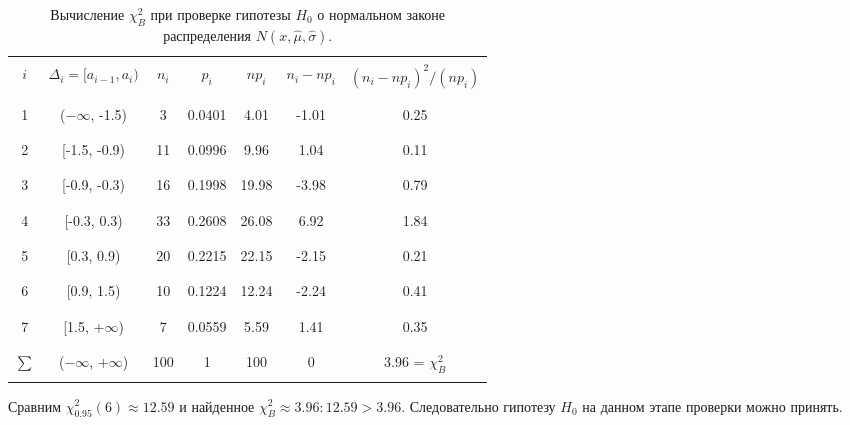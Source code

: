 \documentclass[../body.tex]{subfiles}
\begin{document}
	\begin{table}[H]
		\centering
		\begin{tabular}{| c | c | c | c | c | c | c |}
			\hline \hline
			&  &  &  &  &  & \\
			$i$   & $\Delta_i = [a_{i-1}, a_i)$   &   $n_i$ &   $p_i$ &   $np_i$ &   $n_i - np_i$ &   $(n_i - np_i)^2/(np_i)$ \\
			&  &  &  &  &  & \\
			\hline
			&  &  &  &  &  & \\
			1     & ($-\infty$, -1.5)           &       3 &  0.0401 &     4.01 &          -1.01 &                            0.25 \\ 
			&  &  &  &  &  & \\\hline &  &  &  &  &  & \\
			2     & [-1.5, -0.9)                &      11 &  0.0996 &     9.96 &           1.04 &                            0.11 \\ 
			&  &  &  &  &  & \\\hline &  &  &  &  &  & \\
			3     & [-0.9, -0.3)                &      16 &  0.1998 &    19.98 &          -3.98 &                            0.79 \\ 
			&  &  &  &  &  & \\\hline &  &  &  &  &  & \\
			4     & [-0.3, 0.3)                 &      33 &  0.2608 &    26.08 &           6.92 &                            1.84 \\ 
			&  &  &  &  &  & \\\hline &  &  &  &  &  & \\
			5     & [0.3, 0.9)                  &      20 &  0.2215 &    22.15 &          -2.15 &                            0.21 \\ 
			&  &  &  &  &  & \\\hline &  &  &  &  &  & \\
			6     & [0.9, 1.5)                  &      10 &  0.1224 &    12.24 &          -2.24 &                            0.41 \\ 
			&  &  &  &  &  & \\\hline &  &  &  &  &  & \\
			7     & [1.5, $+\infty$)             &       7 &  0.0559 &     5.59 &           1.41 &                            0.35 \\ 
			&  &  &  &  &  & \\\hline &  &  &  &  &  & \\
			$\sum$& ($-\infty$, $+\infty$)                           &     100 &  1      &   100    &           0    &                            3.96 = $\chi_B^2$ \\
			&  &  &  &  &  & \\\hline \hline
		\end{tabular}
		\caption{Вычисление $\chi_B^2$ при проверке гипотезы $H_0$ о нормальном законе распределения $N(x, \hat{\mu}, \hat{\sigma})$.}
		\label{chi2}
	\end{table}
Сравним $\chi_{0.95}^2(6) \approx 12.59$ и найденное  $\chi_B^2 \approx 3.96: 12.59 > 3.96.$ Следовательно гипотезу $H_0$ на данном этапе проверки можно принять.
\end{document}
